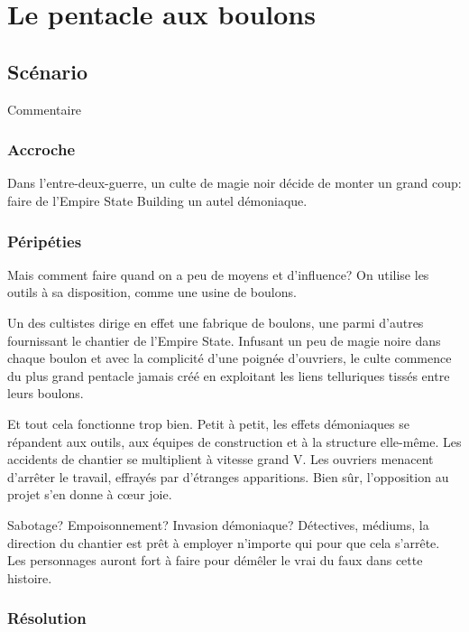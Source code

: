 \chapter{Le pentacle aux boulons}

\section{Scénario}

Commentaire

\subsection{Accroche}

Dans l'entre-deux-guerre, un culte de magie noir décide de monter un grand coup: faire de l'Empire State Building un autel démoniaque.

\subsection{Péripéties}

Mais comment faire quand on a peu de moyens et d'influence? On utilise les outils à sa disposition, comme une usine de boulons.

Un des cultistes dirige en effet une fabrique de boulons, une parmi d'autres fournissant le chantier de l'Empire State. Infusant un peu de magie noire dans chaque boulon et avec la complicité d'une poignée d'ouvriers, le culte commence du plus grand pentacle jamais créé en exploitant les liens telluriques tissés entre leurs boulons.

Et tout cela fonctionne trop bien. Petit à petit, les effets démoniaques se répandent aux outils, aux équipes de construction et à la structure elle-même. Les accidents de chantier se multiplient à vitesse grand V. Les ouvriers menacent d'arrêter le travail, effrayés par d'étranges apparitions. Bien sûr, l'opposition au projet s'en donne à cœur joie.

Sabotage? Empoisonnement? Invasion démoniaque? Détectives, médiums, la direction du chantier est prêt à employer n'importe qui pour que cela s'arrête. Les personnages auront fort à faire pour démêler le vrai du faux dans cette histoire.

\subsection{Résolution}

